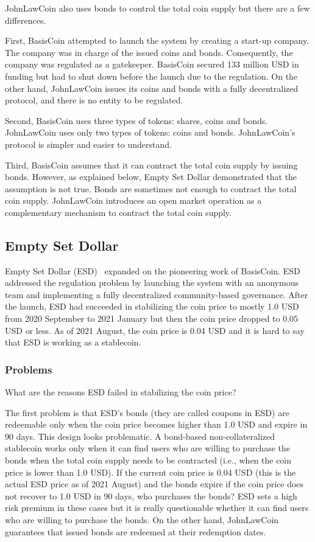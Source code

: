 \documentclass[dvipdfmx,a4paper]{article}
\begin{document}
JohnLawCoin also uses bonds to control the total coin supply but there are a few differences.

First, BasisCoin attempted to launch the system by creating a start-up company. The company was in charge of the issued coins and bonds. Consequently, the company was regulated as a gatekeeper. BasisCoin secured 133 million USD in funding but had to shut down before the launch due to the regulation. On the other hand, JohnLawCoin issues its coins and bonds with a fully decentralized protocol, and there is no entity to be regulated.

Second, BasisCoin uses three types of tokens: shares, coins and bonds. JohnLawCoin uses only two types of tokens: coins and bonds. JohnLawCoin's protocol is simpler and easier to understand.

Third, BasisCoin assumes that it can contract the total coin supply by issuing bonds. However, as explained below, Empty Set Dollar demonstrated that the assumption is not true. Bonds are sometimes not enough to contract the total coin supply. JohnLawCoin introduces an open market operation as a complementary mechanism to contract the total coin supply.

\subsection{Empty Set Dollar}

Empty Set Dollar (ESD)~\cite{emptysetdollar} expanded on the pioneering work of BasisCoin. ESD addressed the regulation problem by launching the system with an anonymous team and implementing a fully decentralized community-based governance. After the launch, ESD had succeeded in stabilizing the coin price to mostly 1.0 USD from 2020 September to 2021 January but then the coin price dropped to 0.05 USD or less. As of 2021 August, the coin price is 0.04 USD and it is hard to say that ESD is working as a stablecoin.

\subsubsection{Problems}

What are the reasons ESD failed in stabilizing the coin price?

The first problem is that ESD's bonds (they are called coupons in ESD) are redeemable only when the coin price becomes higher than 1.0 USD and expire in 90 days. This design looks problematic. A bond-based non-collateralized stablecoin works only when it can find users who are willing to purchase the bonds when the total coin supply needs to be contracted (i.e., when the coin price is lower than 1.0 USD). If the current coin price is 0.04 USD (this is the actual ESD price as of 2021 August) and the bonds expire if the coin price does not recover to 1.0 USD in 90 days, who purchases the bonds? ESD sets a high risk premium in these cases but it is really questionable whether it can find users who are willing to purchase the bonds. On the other hand, JohnLawCoin guarantees that issued bonds are redeemed at their redemption dates.
\end{document}
